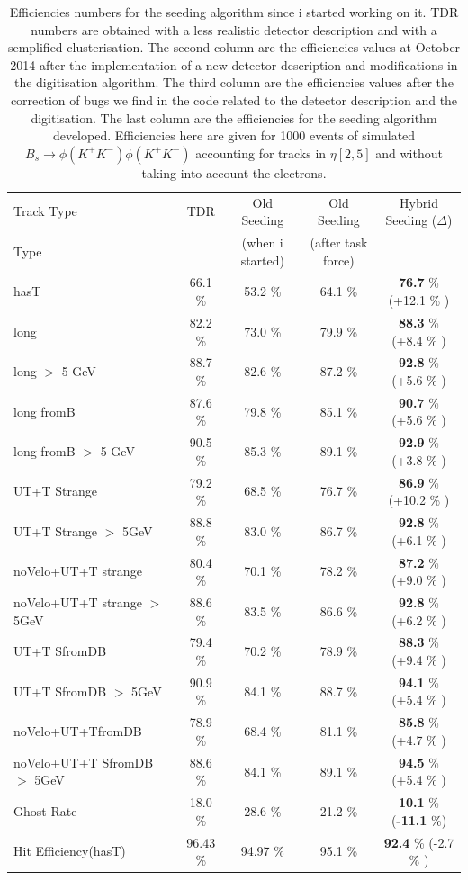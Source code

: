 \documentclass[paper=a4, fontsize=10pt]{scrartcl}
\numberwithin{equation}{section}		%
\numberwithin{figure}{section}			%
\numberwithin{table}{section}				%
\begin{document}
\begin{table}
\centering 
\begin{tabular}{|l|c|c|c|c}
Track Type & TDR & Old Seeding & Old Seeding & Hybrid Seeding ($\Delta$) \\
Type  & & (when i started) & (after task force) & \\
\hline
hasT                               & 66.1 \% &   53.2 \% & 64.1 \% & \textbf{76.7} \% (+12.1 \% )\\
long                                & 82.2 \% &   73.0 \% & 79.9 \% & \textbf{88.3} \% (+8.4 \% )  \\
long $>$ 5 GeV              & 88.7 \% &  82.6 \% & 87.2 \% & \textbf{92.8} \%  (+5.6 \% )  \\ \hline
long fromB                      & 87.6 \% &  79.8 \% & 85.1 \% &\textbf{90.7} \%  (+5.6 \% )  \\
long fromB $>$ 5 GeV    & 90.5 \% &  85.3 \% & 89.1 \% &\textbf{92.9} \% (+3.8 \% ) \\ \hline
UT+T Strange                 & 79.2 \% &  68.5 \% & 76.7 \% & \textbf{86.9} \%  (+10.2 \% ) \\
UT+T Strange $>$ 5GeV & 88.8 \% & 83.0 \% & 86.7 \% & \textbf{92.8} \%  (+6.1 \% ) \\ \hline
noVelo+UT+T strange     & 80.4 \% & 70.1 \% & 78.2 \% & \textbf{87.2} \%   (+9.0 \% )  \\
noVelo+UT+T strange $>$ 5GeV & 88.6 \% & 83.5 \% & 86.6 \% & \textbf{92.8} \% (+6.2 \% ) \\ \hline
UT+T SfromDB                & 79.4 \% &  70.2 \% & 78.9 \% & \textbf{88.3} \% (+9.4 \% ) \\
UT+T SfromDB $>$ 5GeV & 90.9 \% &   84.1 \% & 88.7 \% & \textbf{94.1} \% (+5.4 \% )\\ \hline
noVelo+UT+TfromDB      & 78.9 \% & 68.4 \% & 81.1 \% & \textbf{85.8} \%  (+4.7 \% )\\
noVelo+UT+T SfromDB $>$ 5GeV & 88.6 \% & 84.1 \% & 89.1 \% & \textbf{94.5} \% (+5.4 \% )\\ \hline
Ghost Rate                      & 18.0 \% & 28.6 \% & 21.2 \% & \textbf{10.1} \%  (\textbf{-11.1} \%)  \\
Hit Efficiency(hasT)         & 96.43 \% & 94.97 \% & 95.1 \% & \textbf{92.4} \% (-2.7 \% ) \\
\end{tabular}
\caption{Efficiencies numbers for the seeding algorithm since i started working on it.
TDR numbers are obtained with a less realistic detector description and with a semplified clusterisation. The second column are the efficiencies values at October 2014 after the implementation of a new detector description and modifications in the digitisation algorithm. The third column are the efficiencies values after the correction of bugs we find in the code related to the detector description and the digitisation. The last column are the efficiencies for the seeding algorithm developed. Efficiencies here are given for 1000 events of simulated $B_{s}\rightarrow \phi(K^+K^-)\phi(K^{+}K^{-})$ accounting for tracks in $\eta [2,5]$ and without taking into account the electrons.}\label{table}
\end{table}
\end{document}
